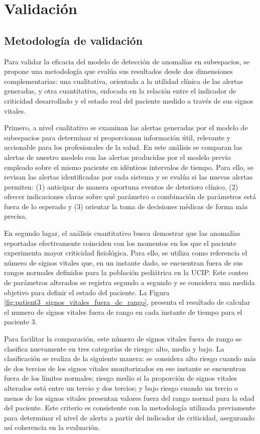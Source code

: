 \chapter{Validación}

\section{Metodología de validación}

Para validar la eficacia del modelo de detección de anomalías en subespacios, se propone una metodología que evalúa sus resultados desde dos dimensiones complementarias: una cualitativa, orientada a la utilidad clínica de las alertas generadas, y otra cuantitativa, enfocada en la relación entre el indicador de criticidad desarrollado y el estado real del paciente medido a través de sus signos vitales.

Primero, a nivel cualitativo se examinan las alertas generadas por el modelo de subespacios para determinar si proporcionan información útil, relevante y accionable para los profesionales de la salud. En este análisis se comparan las alertas de nuestro modelo con las alertas producidas por el modelo previo empleado sobre el mismo paciente en idénticos intervalos de tiempo. Para ello, se revisan las alertas identificadas por cada sistema y se evalúa si las nuevas alertas permiten: (1) anticipar de manera oportuna eventos de deterioro clínico, (2) ofrecer indicaciones claras sobre qué parámetro o combinación de parámetros está fuera de lo esperado y (3) orientar la toma de decisiones médicas de forma más precisa.

En segundo lugar, el análisis cuantitativo busca demostrar que las anomalías reportadas efectivamente coinciden con los momentos en los que el paciente experimenta mayor criticidad fisiológica. Para ello, se utiliza como referencia el número de signos vitales que, en un instante dado, se encuentran fuera de sus rangos normales definidos para la población pediátrica en la UCIP. Este conteo de parámetros alterados se registra segundo a segundo y se considera una medida objetivo para definir el estado del paciente. La Figura \ref{fig:patient3_signos_vitales_fuera_de_rango}, presenta el resultado de calcular el numero de signos vitales fuera de rango en cada instante de tiempo para el paciente 3.

Para facilitar la comparación, este número de signos vitales fuera de rango se clasifica nuevamente en tres categorías de riesgo: alto, medio y bajo. La clasificación se realiza de la siguiente manera: se considera alto riesgo cuando más de dos tercios de los signos vitales monitorizados en ese instante se encuentran fuera de los límites normales; riesgo medio si la proporción de signos vitales alterados está entre un tercio y dos tercios; y bajo riesgo cuando un tercio o menos de los signos vitales presentan valores fuera del rango normal para la edad del paciente. Este criterio es consistente con la metodología utilizada previamente para determinar el nivel de alerta a partir del indicador de criticidad, asegurando así coherencia en la evaluación.

